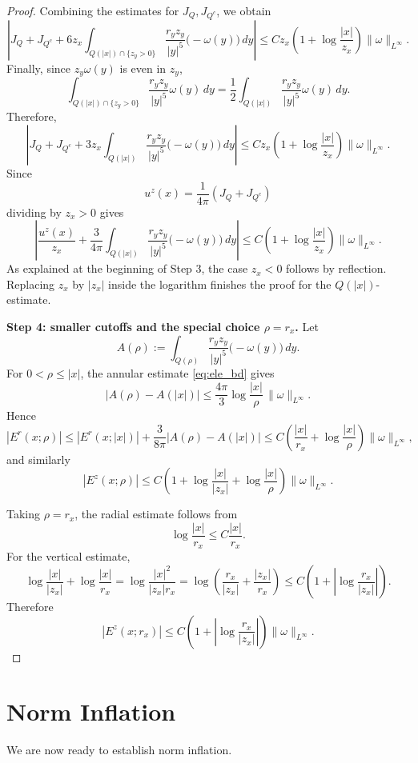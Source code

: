 \documentclass[reqno,11pt]{amsart}
\begin{document}
\begin{proof}
Combining the estimates for \(J_{Q},J_{Q^c}\), we obtain
\[
    \left|
    J_{Q}+J_{Q^c}
    +
    6z_x
    \int_{Q(|x|)\cap\{z_y>0\}}
    \frac{r_yz_y}{|y|^5}\big( -\omega(y) \big)\,dy
    \right|
    \le
    C z_x
    \left(1+\log\frac{|x|}{z_x}\right)
    \|\omega\|_{L^\infty}.
\]
Finally, since \(z_y\omega(y)\) is even in \(z_y\),
\[
    \int_{Q(|x|)\cap\{z_y>0\}}
    \frac{r_yz_y}{|y|^5}\omega(y)\,dy
    =
    \frac12
    \int_{Q(|x|)}
    \frac{r_yz_y}{|y|^5}\omega(y)\,dy.
\]
Therefore,
\[
    \left|
    J_{Q}+J_{Q^c}
    +
    3z_x
    \int_{Q(|x|)}
    \frac{r_yz_y}{|y|^5} \big( -\omega(y)\big)\,dy
    \right|
    \le
    C z_x
    \left(1+\log\frac{|x|}{z_x}\right)
    \|\omega\|_{L^\infty}.
\]
Since
\[
    u^z(x)
    =
    \frac1{4\pi}
    (J_{Q}+J_{Q^c})
\]
dividing by \(z_x>0\) gives
\[
    \left|
    \frac{u^z(x)}{z_x}
    +
    \frac{3}{4\pi}
    \int_{Q(|x|)}
    \frac{r_yz_y}{|y|^5}\big( -\omega(y) \big)\,dy
    \right|
    \le
    C
    \left(1+\log\frac{|x|}{z_x}\right)
    \|\omega\|_{L^\infty}.
\]
As explained at the beginning of Step 3, the case \(z_x<0\) follows by reflection.
Replacing \(z_x\) by \(|z_x|\) inside the logarithm finishes the proof for the $Q(|x|)$-estimate.

\medskip
\noindent\textbf{Step 4: smaller cutoffs and the special choice \(\rho=r_x\).}
Let
\[
A(\rho):=
\int_{Q(\rho)}
\frac{r_yz_y}{|y|^5} \big( -\omega(y) \big)\,dy.
\]
For \(0<\rho\le |x|\), the annular estimate \eqref{eq:ele_bd} gives
\[
|A(\rho)-A(|x|)|
\le
\frac{4\pi}{3}
\log\frac{|x|}{\rho}\,
\|\omega\|_{L^\infty}.
\]
Hence
\[
|E^r(x;\rho)|
\le
|E^r(x;|x|)|
+
\frac{3}{8\pi}|A(\rho)-A(|x|)|
\le
C\left(
\frac{|x|}{r_x}
+
\log\frac{|x|}{\rho}
\right)
\|\omega\|_{L^\infty},
\]
and similarly
\[
|E^z(x;\rho)|
\le
C\left(
1+\log\frac{|x|}{|z_x|}
+
\log\frac{|x|}{\rho}
\right)
\|\omega\|_{L^\infty}.
\]

Taking \(\rho=r_x\), the radial estimate follows from
\[
\log\frac{|x|}{r_x}\le C\frac{|x|}{r_x}.
\]
For the vertical estimate,  
\[
\log\frac{|x|}{|z_x|}+\log\frac{|x|}{r_x}
=
\log\frac{|x|^2}{|z_x|r_x}
=
\log\left(\frac{r_x}{|z_x|}+\frac{|z_x|}{r_x}\right)
\le
C\left(1+\left|\log\frac{r_x}{|z_x|}\right|\right).
\]
Therefore
\[
|E^z(x;r_x)|
\le
C\left(
1+\left|\log\frac{r_x}{|z_x|}\right|
\right)
\|\omega\|_{L^\infty}.
\]

\end{proof}


\section{Norm Inflation}
\label{sec:norm_inflation}
We are now ready to establish norm inflation.
\end{document}
